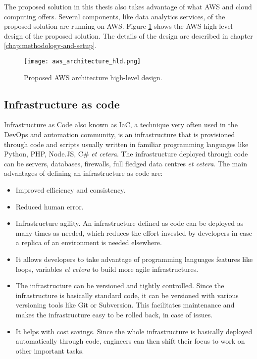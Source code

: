 The proposed solution in this thesis also takes advantage of what AWS and cloud computing offers. Several components, like data analytics services, of the proposed solution are running on AWS. Figure \ref{fig:aws-architecture-hld} shows the AWS high-level design of the proposed solution. The details of the design are described in chapter \ref{chap:methodology-and-setup}.

\begin{figure}[H]
    \centering \texttt{[image: aws\_architecture\_hld.png]}
    \caption{Proposed AWS architecture high-level design.}
    \label{fig:aws-architecture-hld}
\end{figure}



\subsection{Infrastructure as code}
\label{subsec:iac}

Infrastructure as Code also known as IaC, a technique very often used in the DevOps and automation community, is an infrastructure that is provisioned through code and scripts usually written in familiar programming languages like Python, PHP, Node.JS, C\# \textit{et cetera}. The infrastructure deployed through code can be servers, databases, firewalls, full fledged data centres \textit{et cetera}. The main advantages of defining an infrastructure as code are:

\begin{itemize}
    \item Improved efficiency and consistency.
    \item Reduced human error.
    \item Infrastructure agility. An infrastructure defined as code can be deployed as many times as needed, which reduces the effort invested by developers in case a replica of an environment is needed elsewhere.
    \item It allows developers to take advantage of programming languages features like loops, variables \textit{et cetera} to build more agile infrastructures.
    \item The infrastructure can be versioned and tightly controlled. Since the infrastructure is basically standard code, it can be versioned with various versioning tools like Git or Subversion. This facilitates maintenance and makes the infrastructure easy to be rolled back, in case of issues.
    \item It helps with cost savings. Since the whole infrastructure is basically deployed automatically through code, engineers can then shift their focus to work on other important tasks.
\end{itemize}

